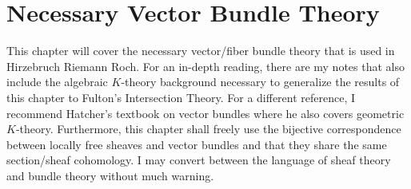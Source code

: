 \documentclass{book}
\newcommand{\C}{{\mathbb{C}}}
\begin{document}







%



%
%
%
%
%
%

\chapter{Necessary Vector Bundle Theory}\label{cha:characteristicClass}

This chapter will cover the necessary vector/fiber bundle theory that is used in Hirzebruch Riemann Roch. For
an in-depth reading, there are my notes \cite{NateKTheory} that also include the algebraic $K$-theory
background necessary to generalize the results of this chapter to Fulton's Intersection Theory. For
a different reference, I recommend Hatcher's textbook on vector bundles \cite{hatcherVectorBundlesKTheory2017}
where he also covers geometric $K$-theory. Furthermore, this chapter shall freely use the bijective
correspondence between locally free sheaves and vector bundles and that they share the same section/sheaf
cohomology. I may convert between the language of sheaf theory and bundle theory without much warning.
\end{document}
